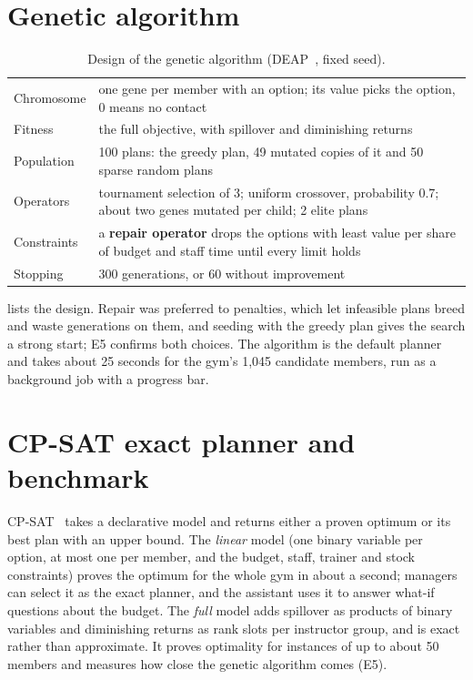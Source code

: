 \section{Genetic algorithm}

\begin{table}[tb]
  \caption{Design of the genetic algorithm (DEAP~\cite{fortin2012deap}, fixed seed).}
  \label{tab:ga}
  \begin{tabularx}{\linewidth}{@{}l L@{}}
    \toprule
     &  \\
    \midrule
    Chromosome & one gene per member with an option; its value picks the option, 0 means no contact \\
    Fitness & the full objective, with spillover and diminishing returns \\
    Population & 100 plans: the greedy plan, 49 mutated copies of it and 50 sparse random plans \\
    Operators & tournament selection of 3; uniform crossover, probability 0.7; about two genes mutated per child; 2 elite plans \\
    Constraints & a \textbf{repair operator} drops the options with least value per share of budget and staff time until every limit holds \\
    Stopping & 300 generations, or 60 without improvement \\
    \bottomrule
  \end{tabularx}
\end{table}

 lists the design. Repair was preferred to penalties, which let infeasible plans breed and waste generations on them, and seeding with the greedy plan gives the search a strong start; E5 confirms both choices. The algorithm is the default planner and takes about 25 seconds for the gym's 1,045 candidate members, run as a background job with a progress bar.

\section{CP-SAT exact planner and benchmark}

CP-SAT~\cite{ortools} takes a declarative model and returns either a proven optimum or its best plan with an upper bound. The \emph{linear} model (one binary variable per option, at most one per member, and the budget, staff, trainer and stock constraints) proves the optimum for the whole gym in about a second; managers can select it as the exact planner, and the assistant uses it to answer what-if questions about the budget. The \emph{full} model adds spillover as products of binary variables and diminishing returns as rank slots per instructor group, and is exact rather than approximate. It proves optimality for instances of up to about 50 members and measures how close the genetic algorithm comes (E5).

